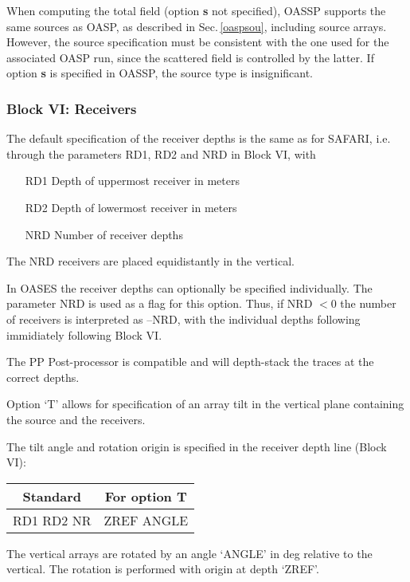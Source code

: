 When computing the total field (option {\bf s} not specified), OASSP
supports the same sources as OASP, as described in
Sec.\,\ref{oaspsou}, including source arrays. However, the source
specification must be consistent with the one used for the associated
OASP run, since the scattered field is controlled by the latter.  If
option {\bf s} is specified in OASSP, the source type is
insignificant.


\subsubsection{Block VI: Receivers}

The default specification of the receiver depths is the same as for
SAFARI, i.e. through the parameters RD1, RD2 and NRD in Block VI, with
\begin{itemize}
\item[RD1]  Depth of uppermost receiver in meters
\item[RD2]  Depth of lowermost receiver in meters
\item[NRD]   Number of receiver depths 
\end{itemize}

The NRD receivers are placed equidistantly in the vertical.


In OASES the receiver depths can optionally be specified individually.
The parameter NRD is used as a flag for this option. Thus, if NRD $< 0$
the number of receivers is interpreted as --NRD, with the individual
depths following immidiately following Block VI. 

The PP Post-processor is compatible and will depth-stack the traces at
the correct depths.


Option `T' allows for specification of an array tilt in the
vertical plane containing the source and the receivers.

The tilt angle and rotation origin is specified in the receiver depth
line (Block VI):

\begin{tabular}{cc}
   Standard   &    For option T \\ \hline
RD1 RD2 NR &  ZREF  ANGLE
\end{tabular}


The vertical arrays are rotated by an angle `ANGLE' in deg relative
to the vertical. The rotation is performed with origin at depth `ZREF'.

